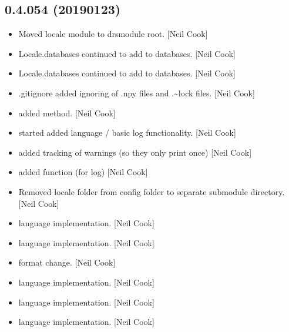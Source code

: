 \documentclass[a4paper,10pt,english]{report}
\begin{document}
\subsection{0.4.054 (2019\sphinxhyphen{}01\sphinxhyphen{}23)}
\label{\detokenize{misc/changelog:id229}}\begin{itemize}
\item {} 
Moved locale module to drsmodule root. {[}Neil Cook{]}

\item {} 
Locale.databases \sphinxhyphen{} continued to add to databases. {[}Neil Cook{]}

\item {} 
Locale.databases \sphinxhyphen{} continued to add to databases. {[}Neil Cook{]}

\item {} 
.gitignore \sphinxhyphen{} added ignoring of .npy files and .\textasciitilde{}lock files. {[}Neil
Cook{]}

\item {} 
 \sphinxhyphen{} added  method. {[}Neil
Cook{]}

\item {} 
 \sphinxhyphen{} started added language / basic log
functionality. {[}Neil Cook{]}

\item {} 
 \sphinxhyphen{} added tracking of warnings (so
they only print once) {[}Neil Cook{]}

\item {} 
 \sphinxhyphen{} added  function (for log) {[}Neil
Cook{]}

\item {} 
Removed locale folder from config folder to separate sub\sphinxhyphen{}module
directory. {[}Neil Cook{]}

\item {} 
 \sphinxhyphen{} language implementation.
{[}Neil Cook{]}

\item {} 
 \sphinxhyphen{} language implementation.
{[}Neil Cook{]}

\item {} 
 \sphinxhyphen{} format change. {[}Neil Cook{]}

\item {} 
 \sphinxhyphen{} language implementation. {[}Neil Cook{]}

\item {} 
 \sphinxhyphen{} language implementation. {[}Neil Cook{]}

\item {} 
 \sphinxhyphen{} language implementation. {[}Neil Cook{]}

\end{itemize}
\end{document}
